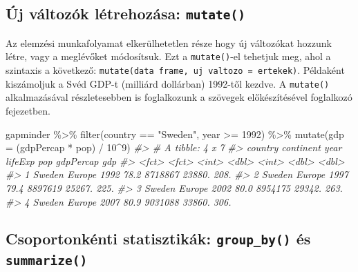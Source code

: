 \documentclass[
]{book}
\newenvironment{Shaded}{\begin{snugshade}}{\end{snugshade}}
\newcommand{\AttributeTok}[1]{\textcolor[rgb]{0.77,0.63,0.00}{#1}}
\newcommand{\CommentTok}[1]{\textcolor[rgb]{0.56,0.35,0.01}{\textit{#1}}}
\newcommand{\DecValTok}[1]{\textcolor[rgb]{0.00,0.00,0.81}{#1}}
\newcommand{\FunctionTok}[1]{\textcolor[rgb]{0.00,0.00,0.00}{#1}}
\newcommand{\NormalTok}[1]{#1}
\newcommand{\SpecialCharTok}[1]{\textcolor[rgb]{0.00,0.00,0.00}{#1}}
\newcommand{\StringTok}[1]{\textcolor[rgb]{0.31,0.60,0.02}{#1}}
\begin{document}
\hypertarget{uxfaj-vuxe1ltozuxf3k-luxe9trehozuxe1sa-mutate}{%
\subsection{\texorpdfstring{Új változók létrehozása:
\texttt{mutate()}}{Új változók létrehozása: mutate()}}\label{uxfaj-vuxe1ltozuxf3k-luxe9trehozuxe1sa-mutate}}

Az elemzési munkafolyamat elkerülhetetlen része hogy új változókat
hozzunk létre, vagy a meglévőket módosítsuk. Ezt a \texttt{mutate()}-el
tehetjuk meg, ahol a szintaxis a következő:
\texttt{mutate(data\ frame,\ uj\ valtozo\ =\ ertekek)}. Példaként
kiszámoljuk a Svéd GDP-t (milliárd dollárban) 1992-től kezdve. A
\texttt{mutate()} alkalmazásával részletesebben is foglalkozunk a
szövegek előkészítésével foglalkozó fejezetben.

\begin{Shaded}
\begin{Highlighting}[]
\NormalTok{gapminder }\SpecialCharTok{\%\textgreater{}\%}
  \FunctionTok{filter}\NormalTok{(country }\SpecialCharTok{==} \StringTok{"Sweden"}\NormalTok{, year }\SpecialCharTok{\textgreater{}=} \DecValTok{1992}\NormalTok{) }\SpecialCharTok{\%\textgreater{}\%}
  \FunctionTok{mutate}\NormalTok{(}\AttributeTok{gdp =}\NormalTok{ (gdpPercap }\SpecialCharTok{*}\NormalTok{ pop) }\SpecialCharTok{/} \DecValTok{10}\SpecialCharTok{\^{}}\DecValTok{9}\NormalTok{)}
\CommentTok{\#\textgreater{} \# A tibble: 4 x 7}
\CommentTok{\#\textgreater{}   country continent  year lifeExp     pop gdpPercap   gdp}
\CommentTok{\#\textgreater{}   \textless{}fct\textgreater{}   \textless{}fct\textgreater{}     \textless{}int\textgreater{}   \textless{}dbl\textgreater{}   \textless{}int\textgreater{}     \textless{}dbl\textgreater{} \textless{}dbl\textgreater{}}
\CommentTok{\#\textgreater{} 1 Sweden  Europe     1992    78.2 8718867    23880.  208.}
\CommentTok{\#\textgreater{} 2 Sweden  Europe     1997    79.4 8897619    25267.  225.}
\CommentTok{\#\textgreater{} 3 Sweden  Europe     2002    80.0 8954175    29342.  263.}
\CommentTok{\#\textgreater{} 4 Sweden  Europe     2007    80.9 9031088    33860.  306.}
\end{Highlighting}
\end{Shaded}

\hypertarget{csoportonkuxe9nti-statisztikuxe1k-group_by-uxe9s-summarize}{%
\subsection{\texorpdfstring{Csoportonkénti statisztikák:
\texttt{group\_by()} és
\texttt{summarize()}}{Csoportonkénti statisztikák: group\_by() és summarize()}}\label{csoportonkuxe9nti-statisztikuxe1k-group_by-uxe9s-summarize}}
\end{document}
